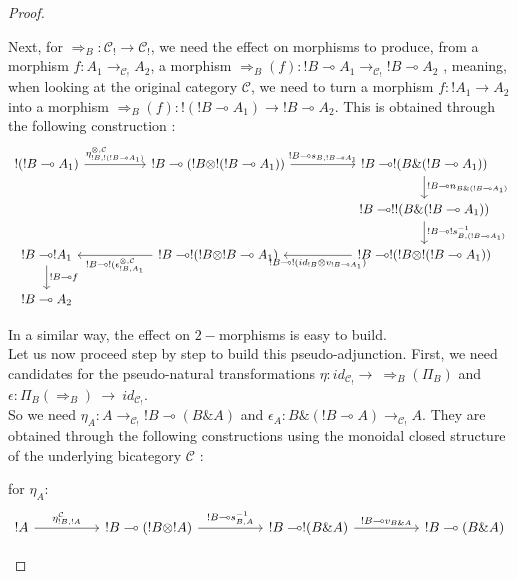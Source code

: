 \documentclass[a4paper, 12pt, twoside,openright]{report}
\begin{document}
\begin{proof}
\begin{itemize}
Next, for $\Rightarrow_B: \mathcal{C}_! \rightarrow \mathcal{C}_!$, we need the effect on morphisms to produce, from a morphism $f: A_1 \rightarrow_{\mathcal{C}_!} A_2$, a morphism $\Rightarrow_B(f) :!B \multimap A_1 \rightarrow_{\mathcal{C}_!} !B \multimap A_2$ , meaning, when looking at the original category $\mathcal{C}$, we need to turn a morphism $f: !A_1 \rightarrow A_2$ into a morphism $\Rightarrow_B(f) :!(!B \multimap A_1) \rightarrow !B \multimap A_2$. This is obtained through the following construction :
$$\begin{tikzcd}
!(!B\multimap A_1)
\arrow{rr}{\eta^{\otimes,\mathcal{C}}_{!B,!(!B\multimap A_1)}}
&&
!B \multimap (!B \otimes !(!B\multimap A_1))
\arrow{rr}{!B\multimap s_{B,!B\multimap A_1}}
&&
!B \multimap !(B \& (!B\multimap A_1))
\arrow{d}{!B \multimap n_{B \& (!B\multimap A_1)}}
\\
&&&&
!B \multimap !!(B \& (!B\multimap A_1))
\arrow{d}{!B \multimap ! s^{-1}_{B, (!B\multimap A_1)}}
\\
!B \multimap !A_1
\arrow{d}{!B\multimap f}
&&
!B \multimap !(!B \otimes !B\multimap A_1)
\arrow{ll}{!B \multimap !(\epsilon^{\otimes, \mathcal{C}}_{!B,A_1}}
&&
!B \multimap !(!B \otimes !(!B\multimap A_1))
\arrow{ll}{!B \multimap ! (id_{!B} \otimes v_{!B\multimap A_1})}
\\
!B \multimap A_2
\end{tikzcd}$$
 
In a similar way, the effect on $2-$morphisms is easy to build.\\

Let us now proceed step by step to build this pseudo-adjunction. First, we need candidates for the pseudo-natural transformations $\eta: id_{\mathcal{C}_!} \rightarrow ~ \Rightarrow_B (\Pi_B)$ and $\epsilon : \Pi_B (\Rightarrow_B )~\rightarrow ~id_{\mathcal{C}_!}$.\\
So we need $\eta_A : A \rightarrow_{\mathcal{C}_!} !B \multimap (B \& A)$ and $\epsilon_A : B \& (!B \multimap A) \rightarrow_{\mathcal{C}_!} A $. They are obtained through the following constructions using the monoidal closed structure of the underlying bicategory $\mathcal{C}$ :

for $\eta_A :$
$$
\begin{tikzcd}
!A
\arrow{rr}{\eta^{\mathcal{C}}_{!B,!A}}
&&
!B \multimap (!B \otimes !A)
\arrow{rr}{!B \multimap s^{-1}_{B,A}}
&&
!B \multimap !(B \& A)
\arrow{rr}{!B \multimap v_{B \& A}}
&&
!B \multimap (B \& A)
\end{tikzcd}$$


\end{itemize}
\end{proof}
\end{document}
